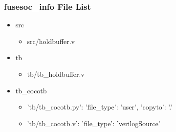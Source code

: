 \subsubsection{fusesoc\_info File List}
\begin{itemize}
\item src
	\begin{itemize}
	\item src/holdbuffer.v
	\end{itemize}
\item tb
	\begin{itemize}
	\item tb/tb\_holdbuffer.v
	\end{itemize}
\item tb\_cocotb
	\begin{itemize}
	\item {'tb/tb\_cocotb.py': {'file\_type': 'user', 'copyto': '.'}}
	\item {'tb/tb\_cocotb.v': {'file\_type': 'verilogSource'}}
	\end{itemize}
\end{itemize}
